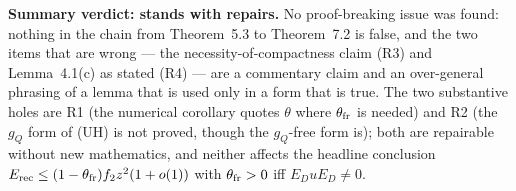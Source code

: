 \documentclass[11pt]{article}
\newcommand{\Erec}{E_{\mathrm{rec}}}\newcommand{\Gs}{\mathcal G}
\begin{document}
\begin{verdictgap}
\textbf{Summary verdict: stands with repairs.}  No proof-breaking issue was found: nothing
in the chain from Theorem~5.3 to Theorem~7.2 is false, and the two items that are wrong ---
the necessity-of-compactness claim (R3) and Lemma~4.1(c) as stated (R4) --- are a commentary
claim and an over-general phrasing of a lemma that is used only in a form that is true.  The
two substantive holes are R1 (the numerical corollary quotes $\theta$ where
$\theta_{\rm fr}$ is needed) and R2 (the $g_Q$ form of (UH) is not proved, though the
$g_Q$-free form is); both are repairable without new mathematics, and neither affects the
headline conclusion $\Erec\le(1-\theta_{\rm fr})f_2z^2(1+o(1))$ with $\theta_{\rm fr}>0$
iff $E_DuE_D\ne0$.
\end{verdictgap}
\end{document}
